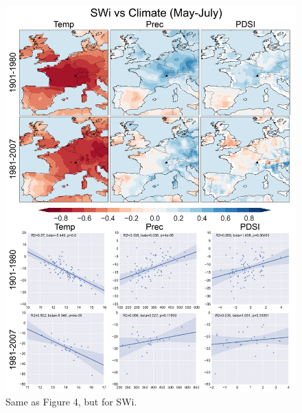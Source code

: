 \documentclass[12pt]{article}
\begin{document}
\begin{figure}
\center
\includegraphics[width=.9\columnwidth,scale=2]{SUPP_fig_11_SWi_MJJ_climate_onedeg_withtrend.png}
\caption{Same as Figure 4, but for SWi.}
\end{figure}
\end{document}
